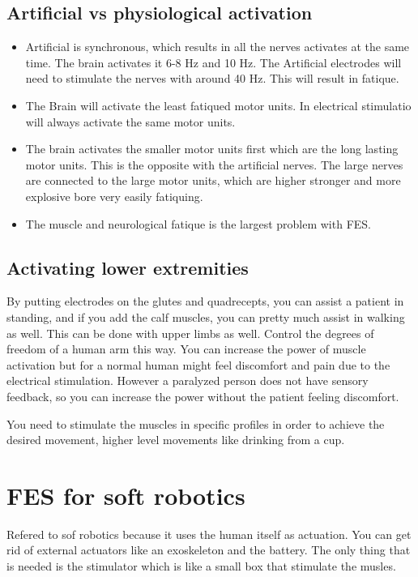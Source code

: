 \documentclass[a4paper]{article}
\begin{document}
\subsection{Artificial vs physiological activation}
\begin{itemize}
	\item Artificial is synchronous, which results in all the nerves activates at the same time. The brain activates it 6-8 Hz and 10 Hz. The Artificial electrodes will need to stimulate the nerves with around 40 Hz. This will result in fatique. 
	\item The Brain will activate the least fatiqued motor units. In electrical stimulatio will always activate the same motor units. 
	\item The brain activates the smaller motor units first which are the long lasting motor units. This is the opposite with the artificial nerves. The large nerves are connected to the large motor units, which are higher stronger and more explosive bore very easily fatiquing. 
	\item The muscle and neurological fatique is the largest problem with FES.
\end{itemize}


\subsection{Activating lower extremities}
By putting electrodes on the glutes and quadrecepts, you can assist a patient in standing, and if you add the calf muscles, you can pretty much assist in walking as well. 
This can be done with upper limbs as well. Control the degrees of freedom of a human arm this way. You can increase the power of muscle activation but for a normal human might feel discomfort and pain due to the electrical stimulation. However a paralyzed person does not have sensory feedback, so you can increase the power without the patient feeling discomfort. 


You need to stimulate the muscles in specific profiles in order to achieve the desired movement, higher level movements like drinking from a cup. 

\section{FES for soft robotics}
Refered to sof robotics because it uses the human itself as actuation. You can get rid of external actuators like an exoskeleton and the battery. The only thing that is needed is the stimulator which is like a small box that stimulate the musles. 
\end{document}
